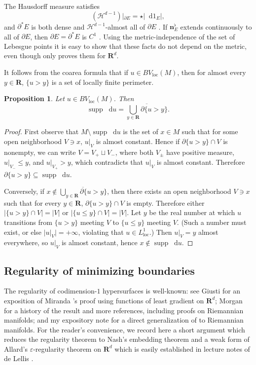 \documentclass[reqno,11pt]{amsart}
\newcommand{\RR}{\mathbf{R}}
\newcommand*\dif{\mathop{}\!\mathrm{d}}
\DeclareMathOperator{\supp}{supp}
\newcommand{\normal}{\mathbf n}
\newcommand{\loc}{\mathrm{loc}}
\newtheorem{proposition}[theorem]{Proposition}
\theoremstyle{definition}
\numberwithin{equation}{section}
\begin{document}
The Hausdorff measure satisfies
$$(\mathcal H^{d - 1})|_{\partial E} = \star |\dif 1_E|,$$
and $\partial^* E$ is both dense and $\mathcal H^{d - 1}$-almost all of $\partial E$ \cite[Theorem 4.4]{Giusti77}.
If $\normal_E^\flat$ extends continuously to all of $\partial E$, then $\partial E = \partial^* E$ is $C^1$ \cite[Theorem 4.11]{Giusti77}.
Using the metric-independence of the set of Lebesgue points it is easy to show that these facts do not depend on the metric, even though \cite{Giusti77} only proves them for $\RR^d$.

It follows from the coarea formula \cite[Theorem 1.23]{Giusti77} that if $u \in BV_\loc(M)$, then for almost every $y \in \RR$, $\{u > y\}$ is a set of locally finite perimeter.

\begin{proposition}
Let $u \in BV_\loc(M)$. Then 
\begin{equation}\label{level sets define support}
	\supp \dif u = \overline{\bigcup_{y \in \RR} \partial \{u > y\}}.
\end{equation}
\end{proposition}
\begin{proof}
First observe that $M \setminus \supp \dif u$ is the set of $x \in M$ such that for some open neighborhood $V \ni x$, $u|_V$ is almost constant.
Hence if $\partial \{u > y\} \cap V$ is nonempty, we can write $V = V_+ \sqcup V_-$, where both $V_\pm$ have positive measure, $u|_{V_-} \leq y$, and $u|_{V_+} > y$, which contradicts that $u|_V$ is almost constant.
Therefore $\partial \{u > y\} \subseteq \supp \dif u$.

Conversely, if $x \notin \overline{\bigcup_{y \in \RR} \partial \{u > y\}}$, then there exists an open neighborhood $V \ni x$ such that for every $y \in \RR$, $\partial \{u > y\} \cap V$ is empty.
Therefore either $|\{u > y\} \cap V| = |V|$ or $|\{u \leq y\} \cap V| = |V|$.
Let $y$ be the real number at which $u$ transitions from $\{u > y\}$ meeting $V$ to $\{u \leq y\}$ meeting $V$.
(Such a number must exist, or else $|u|_V| = +\infty$, violating that $u \in L^1_\loc$.)
Then $u|_V = y$ almost everywhere, so $u|_V$ is almost constant, hence $x \notin \supp \dif u$.
\end{proof}

\subsection{Regularity of minimizing boundaries}
The regularity of codimension-$1$ hypersurfaces is well-known: see Giusti \cite[Theorem 10.11]{Giusti77} for an exposition of Miranda \cite{Miranda66}'s proof using functions of least gradient on $\RR^d$; Morgan \cite[Chapter 8]{Morgan88} for a history of the result and more references, including proofs on Riemannian manifolds; and my expository note \cite{BackusFLG} for a direct generalization of \cite{Miranda66} to Riemannian manifolds.
For the reader's convenience, we record here a short argument which reduces the regularity theorem to Nash's embedding theorem and a weak form of Allard's $\varepsilon$-regularity theorem on $\RR^d$ which is easily established in lecture notes of de Lellis \cite[Theorem 3.2]{DeLellis18}.
\end{document}
